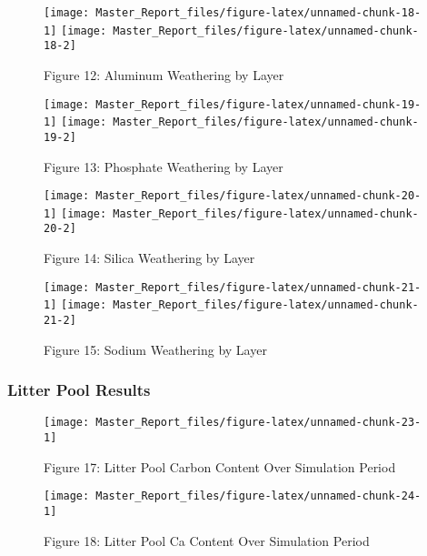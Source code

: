 \documentclass[
]{article}
\begin{document}
\begin{figure}[H]
\texttt{[image: Master\_Report\_files/figure-latex/unnamed-chunk-18-1]} \texttt{[image: Master\_Report\_files/figure-latex/unnamed-chunk-18-2]} \caption{Figure 12: Aluminum Weathering by Layer}\label{fig:unnamed-chunk-18}
\end{figure}

\begin{figure}[H]
\texttt{[image: Master\_Report\_files/figure-latex/unnamed-chunk-19-1]} \texttt{[image: Master\_Report\_files/figure-latex/unnamed-chunk-19-2]} \caption{Figure 13: Phosphate Weathering by Layer}\label{fig:unnamed-chunk-19}
\end{figure}

\begin{figure}[H]
\texttt{[image: Master\_Report\_files/figure-latex/unnamed-chunk-20-1]} \texttt{[image: Master\_Report\_files/figure-latex/unnamed-chunk-20-2]} \caption{Figure 14: Silica Weathering by Layer}\label{fig:unnamed-chunk-20}
\end{figure}

\begin{figure}[H]
\texttt{[image: Master\_Report\_files/figure-latex/unnamed-chunk-21-1]} \texttt{[image: Master\_Report\_files/figure-latex/unnamed-chunk-21-2]} \caption{Figure 15: Sodium Weathering by Layer}\label{fig:unnamed-chunk-21}
\end{figure}

\hypertarget{litter-pool-results}{%
\subsubsection{Litter Pool Results}\label{litter-pool-results}}

\begin{figure}[H]
\texttt{[image: Master\_Report\_files/figure-latex/unnamed-chunk-23-1]} \caption{Figure 17: Litter Pool Carbon Content Over Simulation Period}\label{fig:unnamed-chunk-23}
\end{figure}

\begin{figure}[H]
\texttt{[image: Master\_Report\_files/figure-latex/unnamed-chunk-24-1]} \caption{Figure 18: Litter Pool Ca Content Over Simulation Period}\label{fig:unnamed-chunk-24}
\end{figure}
\end{document}
